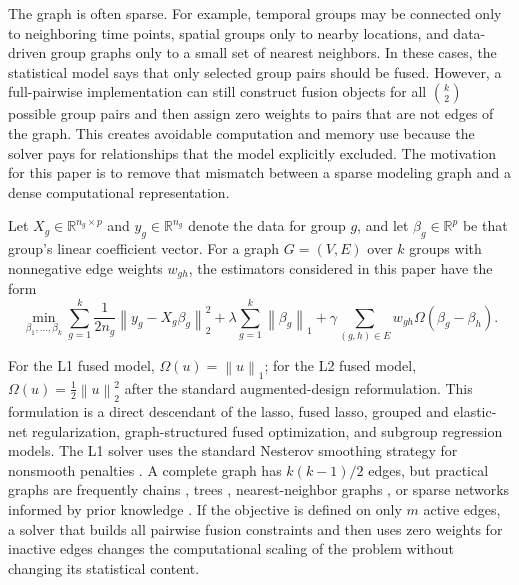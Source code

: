 \documentclass[twoside,11pt]{article}
\newcommand{\R}{\mathbb{R}}
\newcommand{\norm}[1]{\left\lVert #1 \right\rVert}
\begin{document}
The graph is often sparse. 
For example, temporal groups may be connected only to neighboring time points,
spatial groups only to nearby locations, and data-driven group graphs only to a
small set of nearest neighbors. 
In these cases, the statistical model says that only selected group pairs
should be fused. 
However, a full-pairwise implementation can still construct fusion objects for
all \(\binom{k}{2}\) possible group pairs and then assign zero weights to pairs
that are not edges of the graph. 
This creates avoidable computation and memory use because the solver pays for
relationships that the model explicitly excluded. 
The motivation for this paper is to remove that mismatch between a sparse
modeling graph and a dense computational representation.

Let $X_g \in \R^{n_g \times p}$ and $y_g \in \R^{n_g}$ denote the data for group $g$, and let $\beta_g \in \R^p$ be that group's linear coefficient vector. 
For a graph $G=(V,E)$ over $k$ groups with nonnegative edge weights $w_{gh}$, the estimators considered in this paper have the form
\begin{equation}
\label{eq:model}
  \min_{\beta_1,\ldots,\beta_k}
  \sum_{g=1}^{k} \frac{1}{2 n_g} \norm{y_g - X_g \beta_g}_2^2
  + \lambda \sum_{g=1}^{k} \norm{\beta_g}_1
  + \gamma \sum_{(g,h)\in E} w_{gh} \Omega(\beta_g-\beta_h).
\end{equation}

For the L1 fused model, $\Omega(u)=\norm{u}_1$; for the L2 fused model, $\Omega(u)=\frac{1}{2}\norm{u}_2^2$ after the standard augmented-design reformulation. 
This formulation is a direct descendant of the lasso, fused lasso, grouped and elastic-net regularization, graph-structured fused optimization, and subgroup regression models. 
The L1 solver uses the standard Nesterov smoothing strategy for nonsmooth penalties \citep{nesterov2005smooth}.
A complete graph has \(k(k-1)/2\) edges, but practical graphs are frequently
chains \citep{hoefling2010path}, trees \citep{padilla2018dfs},
nearest-neighbor graphs \citep{padilla2020knn}, or sparse networks informed by
prior knowledge \citep{hallac2015network}.
If the objective is defined on only $m$ active edges, a solver that builds all
pairwise fusion constraints and then uses zero weights for inactive edges
changes the computational scaling of the problem without changing its
statistical content.
\end{document}
